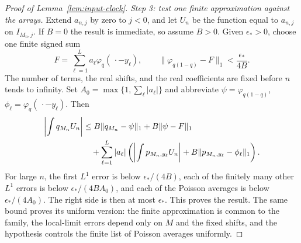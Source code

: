 \begin{proof}[Proof of Lemma~\ref{lem:input-clock}]
\emph{Step 3: test one finite approximation against the arrays.}
Extend $a_{n,j}$ by zero to $j<0$, and let $U_n$ be the
function equal to $a_{n,j}$ on $I_{M_n,j}$.  If $B=0$ the result is
immediate, so assume $B>0$.  Given $\epsilon_*>0$, choose one finite
signed sum
\[
 F=\sum_{\ell=1}^L a_\ell\varphi_q(\,\cdot-y_\ell),
 \qquad
 \|\varphi_{q(1-q)}-F\|_1
                         <\frac{\epsilon_*}{4B}.
\]
The number of terms, the real shifts, and the real coefficients are
fixed before $n$ tends to infinity.  Set
$A_0=\max\{1,\sum_\ell|a_\ell|\}$ and abbreviate
$\psi=\varphi_{q(1-q)}$,
$\phi_\ell=\varphi_q(\,\cdot-y_\ell)$.
Then
\begin{align}
 \left|\int q_{M_n}U_n\right|
 &\le B\|q_{M_n}-\psi\|_1+B\|\psi-F\|_1 \notag\\
 &\quad+\sum_{\ell=1}^L|a_\ell|
       \left(\left|\int p_{M_n,y_\ell}U_n\right|
             +B\|p_{M_n,y_\ell}-\phi_\ell\|_1\right).
 \label{eq:inputclock-finite-approximation}
\end{align}
For large $n$, the first $L^1$ error is below $\epsilon_*/(4B)$,
each of the finitely many other $L^1$ errors is below
$\epsilon_*/(4BA_0)$, and each of the Poisson averages is below
$\epsilon_*/(4A_0)$.  The right side is then at most $\epsilon_*$.
This proves the result.  The same bound proves its uniform version:
the finite approximation is common to the family, the local-limit
errors depend only on $M$ and the fixed shifts, and the hypothesis
controls the finite list of Poisson averages uniformly.
\end{proof}
